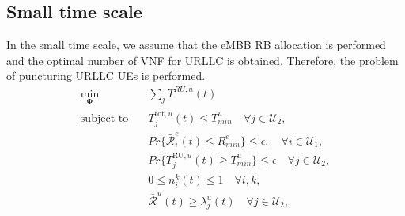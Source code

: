 \documentclass[conference]{IEEEtran}
\begin{document}
\subsection{Small time scale}
In the small time scale, we assume that the eMBB RB allocation is performed and the optimal number of VNF for URLLC is obtained. Therefore, the problem of puncturing URLLC UEs is performed.
\begin{subequations} \label{mainP2}
\begin{alignat}{4}
\min\limits_{  \boldsymbol{\Psi} } &  \sum_j T^{RU, u}(t)       \ \\
\text{subject to} \quad  &T^{\text{tot}, u}_j(t)  \leq T_{min}^u  \quad \forall j \in \mathcal{U}_2, \label{p33} \\
& Pr\{\bar{\mathcal{R}}_{i}^e(t) \leq {R}_{min}^e\}  \leq \epsilon,\quad \forall i \in \mathcal{U}_1, \label{p32}\\
&Pr\{T^{\text{RU}, u}_j(t) \geq T_{min}^u\} \leq \epsilon  \quad \forall j \in \mathcal{U}_2, \label{p34} \\
& 0 \leq n^k_i(t)\leq 1  \quad \forall i,k, \label{p37} \\
& \bar{\mathcal{R}}^u(t) \geq {\lambda}_{j}^u(t) \quad \forall j \in \mathcal{U}_2,\label{p39} 
\end{alignat}
\label{constraints}
\end{subequations}





\end{document}
